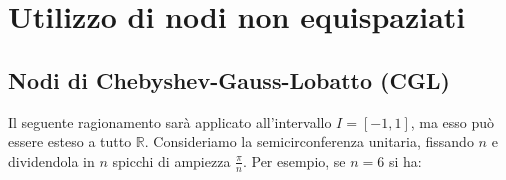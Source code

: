 \section{Utilizzo di nodi non equispaziati}
\label{sec:interpolazione-non-equispaziata}
\subsection{Nodi di Chebyshev-Gauss-Lobatto (CGL)}
Il seguente ragionamento sarà applicato all'intervallo $I=[ -1,1]$, ma esso può essere esteso a tutto $\mathbb{R}$. Consideriamo la semicirconferenza unitaria, fissando $n$ e dividendola in $n$ spicchi di ampiezza $\frac{\pi }{n}$.
Per esempio, se $n=6$ si ha:

\begin{figure}[htpb]
	\centering

	\begin{tikzpicture}[x=0.75pt,y=0.75pt,yscale=-1,xscale=1]


\end{tikzpicture}
\end{figure}
